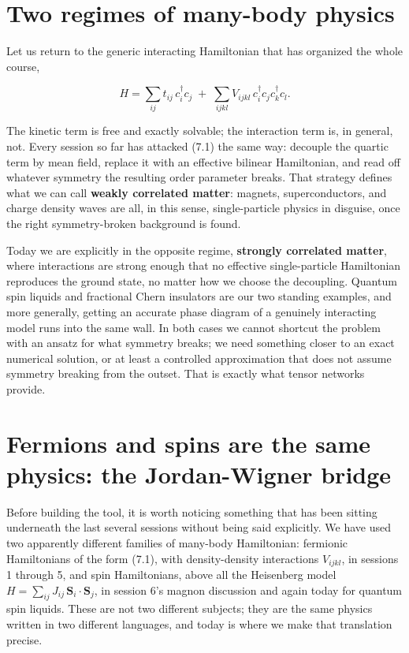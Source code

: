 \section{Two regimes of many-body physics}

Let us return to the generic interacting Hamiltonian that has organized the whole course,

\begin{equation}
H = \sum_{ij} t_{ij}\, c_i^\dagger c_j \;+\; \sum_{ijkl} V_{ijkl}\, c_i^\dagger c_j c_k^\dagger c_l.
\end{equation}

The kinetic term is free and exactly solvable; the interaction term is, in general, not. Every session
so far has attacked (7.1) the same way: decouple the quartic term by mean field, replace it with an
effective bilinear Hamiltonian, and read off whatever symmetry the resulting order parameter breaks.
That strategy defines what we can call \textbf{weakly correlated matter}: magnets, superconductors, and
charge density waves are all, in this sense, single-particle physics in disguise, once the right
symmetry-broken background is found.

Today we are explicitly in the opposite regime, \textbf{strongly correlated matter}, where interactions are
strong enough that no effective single-particle Hamiltonian reproduces the ground state, no matter how
we choose the decoupling. Quantum spin liquids and fractional Chern insulators are our two standing
examples, and more generally, getting an accurate phase diagram of a genuinely interacting model runs
into the same wall. In both cases we cannot shortcut the problem with an ansatz for what symmetry
breaks; we need something closer to an exact numerical solution, or at least a controlled approximation
that does not assume symmetry breaking from the outset. That is exactly what tensor networks provide.

\section{Fermions and spins are the same physics: the Jordan-Wigner bridge}

Before building the tool, it is worth noticing something that has been sitting underneath the last
several sessions without being said explicitly. We have used two apparently different families of
many-body Hamiltonian: fermionic Hamiltonians of the form (7.1), with density-density interactions
$V_{ijkl}$, in sessions 1 through 5, and spin Hamiltonians, above all the Heisenberg model $H =
\sum_{ij} J_{ij}\, \mathbf{S}_i \cdot \mathbf{S}_j$, in session 6's magnon discussion and again today
for quantum spin liquids. These are not two different subjects; they are the same physics written in
two different languages, and today is where we make that translation precise.


